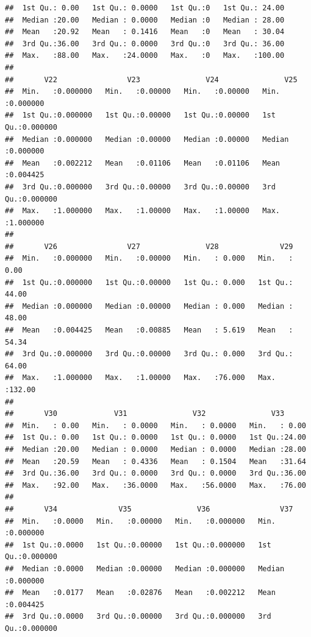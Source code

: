 \documentclass[
]{article}
\begin{document}
\begin{verbatim}
##  1st Qu.: 0.00   1st Qu.: 0.0000   1st Qu.:0   1st Qu.: 24.00  
##  Median :20.00   Median : 0.0000   Median :0   Median : 28.00  
##  Mean   :20.92   Mean   : 0.1416   Mean   :0   Mean   : 30.04  
##  3rd Qu.:36.00   3rd Qu.: 0.0000   3rd Qu.:0   3rd Qu.: 36.00  
##  Max.   :88.00   Max.   :24.0000   Max.   :0   Max.   :100.00  
##                                                                
##       V22                V23               V24               V25          
##  Min.   :0.000000   Min.   :0.00000   Min.   :0.00000   Min.   :0.000000  
##  1st Qu.:0.000000   1st Qu.:0.00000   1st Qu.:0.00000   1st Qu.:0.000000  
##  Median :0.000000   Median :0.00000   Median :0.00000   Median :0.000000  
##  Mean   :0.002212   Mean   :0.01106   Mean   :0.01106   Mean   :0.004425  
##  3rd Qu.:0.000000   3rd Qu.:0.00000   3rd Qu.:0.00000   3rd Qu.:0.000000  
##  Max.   :1.000000   Max.   :1.00000   Max.   :1.00000   Max.   :1.000000  
##                                                                           
##       V26                V27               V28              V29        
##  Min.   :0.000000   Min.   :0.00000   Min.   : 0.000   Min.   :  0.00  
##  1st Qu.:0.000000   1st Qu.:0.00000   1st Qu.: 0.000   1st Qu.: 44.00  
##  Median :0.000000   Median :0.00000   Median : 0.000   Median : 48.00  
##  Mean   :0.004425   Mean   :0.00885   Mean   : 5.619   Mean   : 54.34  
##  3rd Qu.:0.000000   3rd Qu.:0.00000   3rd Qu.: 0.000   3rd Qu.: 64.00  
##  Max.   :1.000000   Max.   :1.00000   Max.   :76.000   Max.   :132.00  
##                                                                        
##       V30             V31               V32               V33       
##  Min.   : 0.00   Min.   : 0.0000   Min.   : 0.0000   Min.   : 0.00  
##  1st Qu.: 0.00   1st Qu.: 0.0000   1st Qu.: 0.0000   1st Qu.:24.00  
##  Median :20.00   Median : 0.0000   Median : 0.0000   Median :28.00  
##  Mean   :20.59   Mean   : 0.4336   Mean   : 0.1504   Mean   :31.64  
##  3rd Qu.:36.00   3rd Qu.: 0.0000   3rd Qu.: 0.0000   3rd Qu.:36.00  
##  Max.   :92.00   Max.   :36.0000   Max.   :56.0000   Max.   :76.00  
##                                                                     
##       V34              V35               V36                V37          
##  Min.   :0.0000   Min.   :0.00000   Min.   :0.000000   Min.   :0.000000  
##  1st Qu.:0.0000   1st Qu.:0.00000   1st Qu.:0.000000   1st Qu.:0.000000  
##  Median :0.0000   Median :0.00000   Median :0.000000   Median :0.000000  
##  Mean   :0.0177   Mean   :0.02876   Mean   :0.002212   Mean   :0.004425  
##  3rd Qu.:0.0000   3rd Qu.:0.00000   3rd Qu.:0.000000   3rd Qu.:0.000000  

\end{verbatim}
\end{document}
